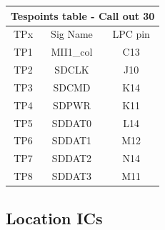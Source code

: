 \clearpage


\begin{longtable}{|c|c|c|} \hline
		\multicolumn{3}{|c|}{Tespoints table - Call out 30}\\ \hline
	TPx & Sig Name & LPC pin \\ \hline
	TP1 & MII1\_col & C13 \\ \hline
	TP2 & SDCLK & J10 \\ \hline
	TP3 & SDCMD & K14 \\ \hline
	TP4 & SDPWR & K11 \\ \hline
	TP5 & SDDAT0 & L14 \\ \hline
	TP6 & SDDAT1 & M12 \\ \hline
	TP7 & SDDAT2 & N14 \\ \hline
	TP8 & SDDAT3 & M11 \\ \hline
	
\end{longtable}	


\subsection{Location ICs}

